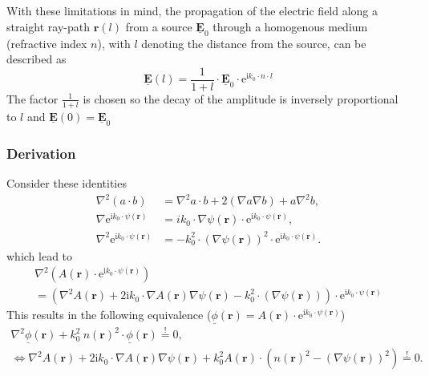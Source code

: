 With these limitations in mind, the propagation of the electric field along a straight ray-path \(\bm{r}(l)\) from a source \(\underline{\bm{E}}_0\) through a homogenous medium (refractive index \(n\)), with \(l\) denoting the distance from the source, can be described as
\begin{equation} \label{eq:field-along-ray-path}
    \underline{\bm{E}}(l) = \frac{1}{1 + l} \cdot \underline{\bm{E}}_0 \cdot \mathrm{e}^{\mathrm{i} k_0 \cdot n \cdot l}
\end{equation}
The factor \(\frac{1}{1 + l}\) is chosen so the decay of the amplitude is inversely proportional to \(l\) and  \(\underline{\bm{E}}(0) = \underline{\bm{E}}_0 \)




\subsubsection{Derivation}\label{derivation}
Consider these identities
\begin{align}
    \nabla^2 (a \cdot b) &= \nabla^2 a \cdot b + 2 (\nabla a \nabla b) + a \nabla^2 b, \\
    \nabla \mathrm{e}^{\mathrm{i} k_0 \cdot \psi(\bm{r})} &= i k_0 \cdot \nabla \psi(\bm{r}) \cdot \mathrm{e}^{\mathrm{i} k_0 \cdot \psi(\bm{r})}, \\
    \nabla^2 \mathrm{e}^{\mathrm{i} k_0 \cdot \psi(\bm{r})} &= - k_0^2 \cdot {(\nabla \psi(\bm{r}))}^2 \cdot \mathrm{e}^{\mathrm{i} k_0 \cdot \psi(\bm{r})}.
\end{align}
which lead to
\begin{gather}
    \nabla^2 (A(\bm{r}) \cdot \mathrm{e}^{\mathrm{i}k_0 \cdot \psi(\bm{r})}) \nonumber \\
    = (\nabla^2 A(\bm{r}) + 2\mathrm{i}k_0 \cdot \nabla A(\bm{r}) \nabla \psi(\bm{r}) - k_0^2 \cdot (\nabla \psi(\bm{r}))) \cdot \mathrm{e}^{\mathrm{i}k_0 \cdot \psi(\bm{r})}
\end{gather}
This results in the following equivalence (\(\underline{\phi}(\bm{r}) = A(\bm{r}) \cdot \mathrm{e}^{\mathrm{i}k_0 \cdot \psi(\bm{r})}\))
\begin{gather}
    \nabla^2 \underline{\phi}(\bm{r}) + k_0^2\ n{(\bm{r})}^2 \cdot \underline{\phi}(\bm{r}) \stackrel{!}{=} 0, \\
    \Leftrightarrow \nabla^2 A(\bm{r}) + 2\mathrm{i}k_0 \cdot \nabla A(\bm{r}) \nabla \psi(\bm{r}) + k_0^2 A(\bm{r}) \cdot ({n(\bm{r})}^2 - {(\nabla \psi(\bm{r}))}^2) \stackrel{!}{=} 0.
\end{gather}